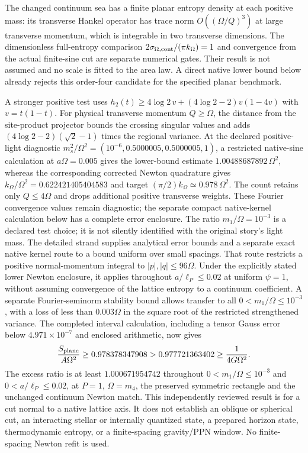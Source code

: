 The changed continuum sea has a finite planar entropy density at each
positive mass: its transverse Hankel operator has trace norm
$O((\Omega/Q)^3)$ at large transverse momentum, which is integrable in
two transverse dimensions. The dimensionless full-entropy comparison
$2\sigma_{\Omega,\rm cont}/(\pi k_\Omega)=1$ and convergence from the
actual finite-sine cut are separate numerical gates. Their result is
not assumed and no scale is fitted to the area law. A direct native
lower bound below already rejects this order-four candidate for the
specified planar benchmark.

A stronger positive test uses
$h_2(t)\geq4\log2\,v+(4\log2-2)v(1-4v)$ with $v=t(1-t)$.
For physical transverse momentum $Q\geq\Omega$, the distance from the
site-product projector bounds the crossing singular values and adds
$(4\log2-2)(\sqrt2-1)$ times the regional variance. At the declared
positive-light diagnostic
$m_s^2/\Omega^2=(10^{-6},0.5000005,0.5000005,1)$, a restricted
native-sine calculation at $a\Omega=0.005$ gives the lower-bound
estimate $1.00488687892\,\Omega^2$, whereas the corresponding corrected
Newton quadrature gives $k_\Omega/\Omega^2=0.622421405404583$ and
target $(\pi/2)k_\Omega\simeq0.978\,\Omega^2$. The count retains
only $Q\leq4\Omega$ and drops additional positive transverse weights.
These Fourier convergence values remain diagnostic; the separate compact
native-kernel calculation below has a complete error enclosure.
The ratio $m_1/\Omega=10^{-3}$ is a declared test choice; it is not
silently identified with the original story's light mass. The detailed
strand supplies analytical error bounds and a separate exact native
kernel route to a bound uniform over small spacings.
That route restricts a positive normal-momentum integral to
$|p|,|q|\leq96\Omega$. Under the explicitly stated lower Newton
enclosure, it applies throughout $a/\ell_P\leq0.02$ at uniform
$\psi=1$, without assuming convergence of the lattice entropy to a
continuum coefficient. A separate Fourier-seminorm stability bound
allows transfer to all $0<m_1/\Omega\leq10^{-3}$, with a loss of less
than $0.003\Omega$ in the square root of the restricted strengthened
variance. The completed interval calculation, including a tensor Gauss
error below $4.971\times10^{-7}$ and enclosed arithmetic, now gives
\[
 \frac{S_{\rm plane}}{A\Omega^2}\geq0.978378347908
       >0.977721363402\geq\frac1{4G\Omega^2}.
\]
The excess ratio is at least $1.000671954742$ throughout
$0<m_1/\Omega\leq10^{-3}$ and $0<a/\ell_P\leq0.02$,
at $P=1$, $\Omega=m_4$, the preserved symmetric rectangle and the
unchanged continuum Newton match. This independently reviewed result
is for a cut normal to a native lattice axis. It does not establish an
oblique or spherical cut, an interacting stellar or internally quantized
state, a prepared horizon state, thermodynamic entropy, or a finite-spacing
gravity/PPN window. No finite-spacing Newton refit is used.

